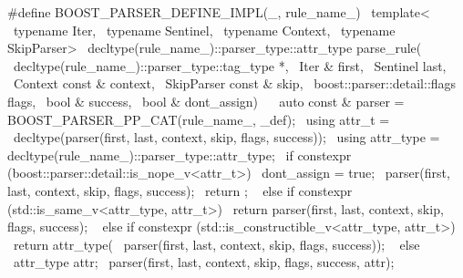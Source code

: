 \begin{code}
#define BOOST_PARSER_DEFINE_IMPL(_, rule_name_)                                \
    template<                                                                  \
        typename Iter,                                                         \
        typename Sentinel,                                                     \
        typename Context,                                                      \
        typename SkipParser>                                                   \
    decltype(rule_name_)::parser_type::attr_type parse_rule(                   \
        decltype(rule_name_)::parser_type::tag_type *,                         \
        Iter & first,                                                          \
        Sentinel last,                                                         \
        Context const & context,                                               \
        SkipParser const & skip,                                               \
        boost::parser::detail::flags flags,                                    \
        bool & success,                                                        \
        bool & dont_assign)                                                    \
    {                                                                          \
        auto const & parser = BOOST_PARSER_PP_CAT(rule_name_, _def);           \
        using attr_t =                                                         \
            decltype(parser(first, last, context, skip, flags, success));      \
        using attr_type = decltype(rule_name_)::parser_type::attr_type;        \
        if constexpr (boost::parser::detail::is_nope_v<attr_t>) {              \
            dont_assign = true;                                                \
            parser(first, last, context, skip, flags, success);                \
            return {};                                                         \
        } else if constexpr (std::is_same_v<attr_type, attr_t>) {              \
            return parser(first, last, context, skip, flags, success);         \
        } else if constexpr (std::is_constructible_v<attr_type, attr_t>) {     \
            return attr_type(                                                  \
                parser(first, last, context, skip, flags, success));           \
        } else {                                                               \
            attr_type attr{};                                                  \
            parser(first, last, context, skip, flags, success, attr);          \
}}
\end{code}
